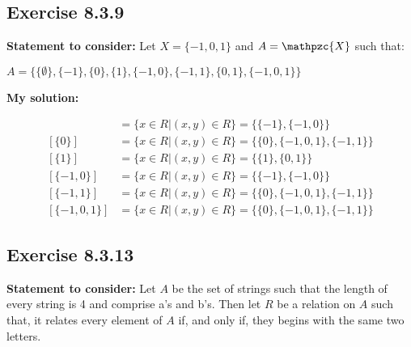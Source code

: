 \documentclass{report}
\newcommand{\cent}[1]{\begin{center}#1\end{center}}
\newcommand{\mAlign}[1]{\begin{align*}#1\end{align*}}
\newcommand{\In}{\! \in \!}
\newcommand{\script}[1]{\mathpzc{#1}}
\newcommand{\assignmentDescription}{\textbf{Statement to consider: }}
\newcommand{\solution}{\textbf{My solution: }}
\newcommand{\Exercise}[1]{\subsection{Exercise #1}}
\begin{document}
	\Exercise{8.3.9}
	
	\assignmentDescription
	Let $X=\{-1,0,1\}$ and $A=\script{X}$ such that:
	
	\cent{$A  = \{\{\emptyset\},\{-1\},\{0\},\{1\},\{-1,0\},\{-1,1\},\{0,1\},\{-1,0,1\}\}$}
	
	\solution
	
	\mAlign{[\{-1\}] &= \{x \in R | (x,y) \In R\} = \{\{-1\},\{-1,0\}\} \\
		[\{0\}] &= \{x \in R | (x,y) \In R\} = \{\{0\},\{-1,0,1\},\{-1,1\}\} \\
		[\{1\}] &= \{x \in R | (x,y) \In R\} = \{\{1\},\{0,1\}\} \\
		[\{-1,0\}] &= \{x \in R | (x,y) \In R\} = \{\{-1\},\{-1,0\}\} \\
		[\{-1,1\}] &= \{x \in R | (x,y) \In R\} = \{\{0\},\{-1,0,1\},\{-1,1\}\} \\
		[\{-1,0,1\}] &= \{x \in R | (x,y) \In R\} = \{\{0\},\{-1,0,1\},\{-1,1\}\}}
	
	\Exercise{8.3.13}
	
	\assignmentDescription
	Let $A$ be the set of strings such that the length of every string is 4 and comprise a's and b's. Then let $R$ be a relation on $A$ such that, it relates every element of $A$ if, and only if, they begins with the same two letters.\\
	
\end{document}
